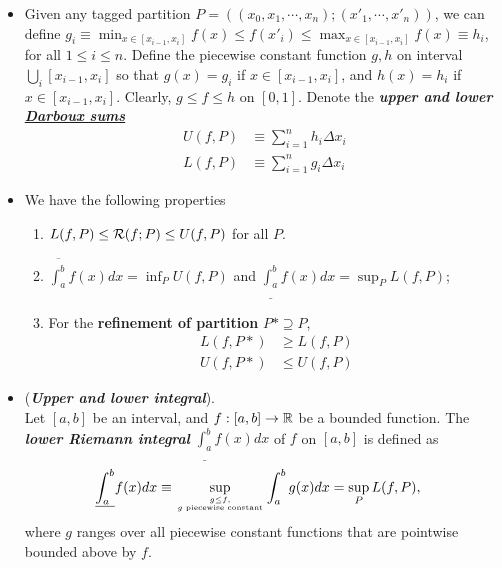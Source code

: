 \documentclass[11pt]{article}
\begin{document}
\begin{itemize}
\item  \begin{definition}
Given any  tagged partition $P=  ((x_{0}, x_{1}, \cdots, x_{n}); (x'_{1}, \cdots, x'_{n}))$, we can define $g_{i}\equiv \min_{x\in [x_{i-1}, x_{i}]}f(x) \le f(x'_{i})\le \max_{x\in [x_{i-1}, x_{i}]}f(x)\equiv h_{i}$, for all $1\le i\le n$. Define the piecewise constant function $g, h$ on interval $\bigcup_{i}[x_{i-1}, x_{i}]$ so that $g(x) = g_{i}$ if $x\in  [x_{i-1}, x_{i}]$, and $h(x) = h_{i}$ if $x\in  [x_{i-1}, x_{i}]$. Clearly, $g \le f \le h$ on $[0,1]$. Denote the \emph{\textbf{upper and lower \underline{Darboux sums}}} 
 \begin{align*}
 U(f,P)&\equiv \sum_{i=1}^{n}h_{i}\Delta x_{i} \\
 L(f,P)&\equiv \sum_{i=1}^{n}g_{i}\Delta x_{i}
 \end{align*}
 \end{definition}
 
 \item \begin{proposition}
 We have the following properties
\begin{enumerate}
\item $L(f,P)\le {\mathcal R}(f ; P) \le U(f,P)$ for all $P$.
\item $\overline{\int_{a}^{b}}f(x)dx = \inf_{P}U(f,P)$ and $\underline{\int_{a}^{b}}f(x)dx = \sup_{P}L(f,P)$;
\item For the \textbf{refinement of partition} $P* \supseteq P$, 
\begin{align*}
L(f, P*) &\ge L(f,P) \\
U(f, P*) &\le U(f,P)
\end{align*}
\end{enumerate} 
\end{proposition}

\item \begin{definition} (\emph{\textbf{Upper and lower integral}}).\\
Let $[a, b]$ be an interval, and $f:  [a, b] \rightarrow {\mathbb R}$ be a bounded function. The \emph{\textbf{lower Riemann integral}} $\underline{\int_{a}^{b}}f(x)dx$ of $f$ on $[a, b]$ is defined as
\begin{align*}
\underline{\int_{a}^{b}}f(x)dx &\equiv \sup\limits_{g\le f, \atop g \text{ piecewise constant}}\int_{a}^{b}g(x)dx =  \sup_{P}L(f,P),
\end{align*}
where $g$ ranges over all piecewise constant functions that are pointwise bounded above by $f$.


\end{definition}
\end{itemize}
\end{document}
